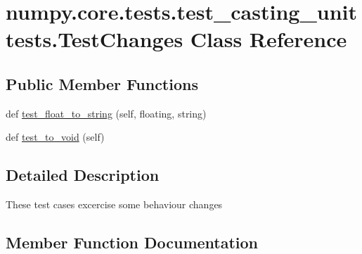 \hypertarget{classnumpy_1_1core_1_1tests_1_1test__casting__unittests_1_1TestChanges}{}\section{numpy.\+core.\+tests.\+test\+\_\+casting\+\_\+unittests.\+Test\+Changes Class Reference}
\label{classnumpy_1_1core_1_1tests_1_1test__casting__unittests_1_1TestChanges}
\subsection*{Public Member Functions}
\begin{DoxyCompactItemize}
\item 
def \hyperlink{classnumpy_1_1core_1_1tests_1_1test__casting__unittests_1_1TestChanges_a2cc9343e42c4ccdaf98e2885b88fc16b}{test\+\_\+float\+\_\+to\+\_\+string} (self, floating, string)
\item 
def \hyperlink{classnumpy_1_1core_1_1tests_1_1test__casting__unittests_1_1TestChanges_ac6435b49025cf762b931ecbdd03ba774}{test\+\_\+to\+\_\+void} (self)
\end{DoxyCompactItemize}


\subsection{Detailed Description}
\begin{DoxyVerb}These test cases excercise some behaviour changes
\end{DoxyVerb}
 

\subsection{Member Function Documentation}
\mbox{\label{classnumpy_1_1core_1_1tests_1_1test__casting__unittests_1_1TestChanges_a2cc9343e42c4ccdaf98e2885b88fc16b}} 
